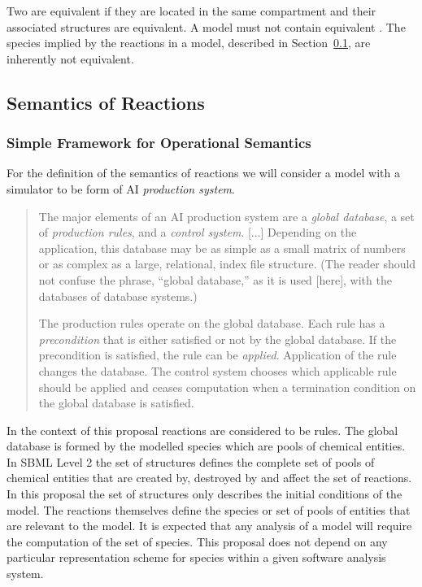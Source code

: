 \documentclass{cekarticle}
\begin{document}
Two  are equivalent if they are located in the same compartment and their associated
 structures are equivalent.  A model must not contain equivalent .
The species implied by the reactions in a model, described in Section~\ref{sec:reaction-semantics},
are inherently not equivalent.

\subsection{Semantics of Reactions}
\label{sec:reaction-semantics}
\subsubsection{Simple Framework for Operational Semantics}

For the definition of the semantics of reactions we will consider a model with a simulator to be form of
AI \emph{production system}.

\begin{quote}
The major elements of an AI production system are a \emph{global database}, a set of
\emph{production rules}, and a \emph{control system}.
[...]
Depending on the application, this database may be as simple as a small matrix of numbers or as
complex as a large, relational, index file structure.  (The reader should not confuse the phrase,
``global database,'' as it is used [here], with the databases of database systems.)

The production rules operate on the global database.  Each rule has a \emph{precondition} that is either
satisfied or not by the global database.  If the precondition is satisfied, the rule can be
\emph{applied}.  Application of the rule changes the database.  The control system chooses which
applicable rule should be applied and ceases computation when a termination condition on the global
database is satisfied.~\citep{Nilsson:1982}
\end{quote}

In the context of this proposal reactions are considered to be rules.  
The global database is formed by
the modelled species which are pools of chemical entities.  
In SBML Level 2 the set of  structures defines the complete set of pools of chemical
entities that are created by, destroyed by and affect the set of reactions. In this proposal the set of
structures only describes the initial conditions of the model.  The reactions themselves define the
species or set of pools of entities that are relevant to the model. 
It is expected that any analysis of a model will require the computation of the set of species.
This proposal does not depend on any particular representation scheme for species within a given
software analysis system.
\end{document}
